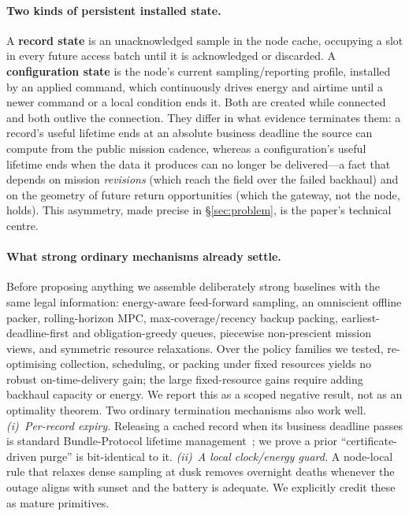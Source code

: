 \documentclass[11pt]{article}
\begin{document}
\paragraph{Two kinds of persistent installed state.}
A \textbf{record state} is an unacknowledged sample in the node cache, occupying a slot in every
future access batch until it is acknowledged or discarded. A \textbf{configuration state} is the
node's current sampling/reporting profile, installed by an applied command, which continuously
drives energy and airtime until a newer command or a local condition ends it. Both are created while
connected and both outlive the connection. They differ in what evidence terminates them: a record's
useful lifetime ends at an absolute business deadline the source can compute from the public mission
cadence, whereas a configuration's useful lifetime ends when the data it produces can no longer be
delivered---a fact that depends on mission \emph{revisions} (which reach the field over the failed
backhaul) and on the geometry of future return opportunities (which the gateway, not the node,
holds). This asymmetry, made precise in \S\ref{sec:problem}, is the paper's technical centre.

\paragraph{What strong ordinary mechanisms already settle.}
Before proposing anything we assemble deliberately strong baselines with the same legal
information: energy-aware feed-forward sampling, an omniscient offline packer, rolling-horizon
MPC, max-coverage/recency backup packing, earliest-deadline-first and obligation-greedy queues,
piecewise non-prescient mission views, and symmetric resource relaxations. Over the policy families
we tested, re-optimising collection, scheduling, or packing under fixed resources yields no robust
on-time-delivery gain; the large fixed-resource gains require adding backhaul capacity or energy.
We report this as a scoped negative result, not as an optimality theorem. Two ordinary termination
mechanisms also work well. \emph{(i)~Per-record expiry.} Releasing a cached record when its business
deadline passes is standard Bundle-Protocol lifetime management~\cite{rfc9171}; we prove a prior
``certificate-driven purge'' is bit-identical to it. \emph{(ii)~A local clock/energy guard.} A
node-local rule that relaxes dense sampling at dusk removes overnight deaths whenever the outage
aligns with sunset and the battery is adequate. We explicitly credit these as mature primitives.
\end{document}
